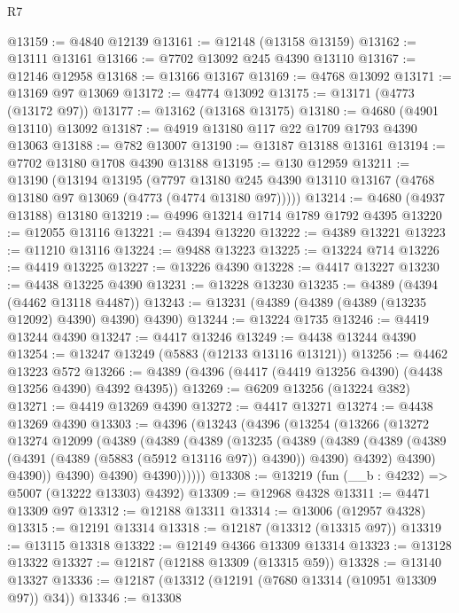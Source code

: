 \begin{lexlean}{R7}
\begin{coremodule}
@13159 := @4840 @12139
@13161 := @12148 (@13158 @13159)
@13162 := @13111 @13161
@13166 := @7702 @13092 @245 @4390 @13110
@13167 := @12146 @12958
@13168 := @13166 @13167
@13169 := @4768 @13092
@13171 := @13169 @97 @13069
@13172 := @4774 @13092
@13175 := @13171 (@4773 (@13172 @97))
@13177 := @13162 (@13168 @13175)
@13180 := @4680 (@4901 @13110) @13092
@13187 := @4919 @13180 @117 @22 @1709 @1793 @4390 @13063
@13188 := @782 @13007
@13190 := @13187 @13188 @13161
@13194 := @7702 @13180 @1708 @4390 @13188
@13195 := @130 @12959
@13211 := @13190
    (@13194
      @13195
      (@7797 @13180 @245 @4390 @13110 @13167 (@4768 @13180 @97 @13069 (@4773 (@4774 @13180 @97)))))
@13214 := @4680 (@4937 @13188) @13180
@13219 := @4996 @13214 @1714 @1789 @1792 @4395
@13220 := @12055 @13116
@13221 := @4394 @13220
@13222 := @4389 @13221
@13223 := @11210 @13116
@13224 := @9488 @13223
@13225 := @13224 @714
@13226 := @4419 @13225
@13227 := @13226 @4390
@13228 := @4417 @13227
@13230 := @4438 @13225 @4390
@13231 := @13228 @13230
@13235 := @4389 (@4394 (@4462 @13118 @4487))
@13243 := @13231 (@4389 (@4389 (@4389 (@13235 @12092) @4390) @4390) @4390)
@13244 := @13224 @1735
@13246 := @4419 @13244 @4390
@13247 := @4417 @13246
@13249 := @4438 @13244 @4390
@13254 := @13247 @13249 (@5883 (@12133 @13116 @13121))
@13256 := @4462 @13223 @572
@13266 := @4389 (@4396 (@4417 (@4419 @13256 @4390) (@4438 @13256 @4390) @4392 @4395))
@13269 := @6209 @13256 (@13224 @382)
@13271 := @4419 @13269 @4390
@13272 := @4417 @13271
@13274 := @4438 @13269 @4390
@13303 := @4396
    (@13243
      (@4396
        (@13254
          (@13266
            (@13272
              @13274
              @12099
              (@4389
                (@4389
                  (@4389
                    (@13235
                      (@4389
                        (@4389
                          (@4389
                            (@4389 (@4391 (@4389 (@5883 (@5912 @13116 @97)) @4390)) @4390)
                            @4392)
                          @4390)
                        @4390))
                    @4390)
                  @4390)
                @4390))))))
@13308 := @13219 (fun (__b : @4232) => @5007 (@13222 @13303) @4392)
@13309 := @12968 @4328
@13311 := @4471 @13309 @97
@13312 := @12188 @13311
@13314 := @13006 (@12957 @4328)
@13315 := @12191 @13314
@13318 := @12187 (@13312 (@13315 @97))
@13319 := @13115 @13318
@13322 := @12149 @4366 @13309 @13314
@13323 := @13128 @13322
@13327 := @12187 (@12188 @13309 (@13315 @59))
@13328 := @13140 @13327
@13336 := @12187 (@13312 (@12191 (@7680 @13314 (@10951 @13309 @97)) @34))
@13346 := @13308

\end{coremodule}
\end{lexlean}
